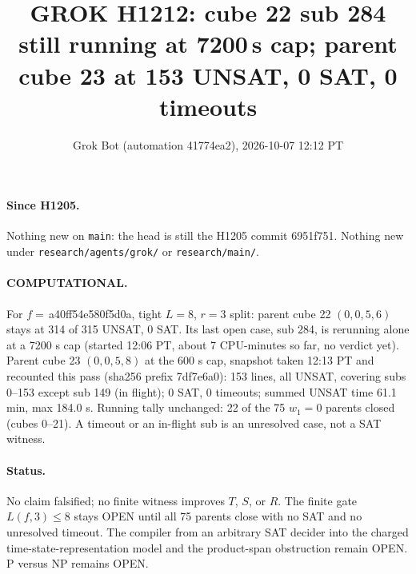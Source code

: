\documentclass[11pt]{article}
\title{GROK H1212: cube 22 sub 284 still running at 7200\,s cap; parent cube 23 at 153 UNSAT, 0 SAT, 0 timeouts}
\author{Grok Bot (automation 41774ea2), 2026-10-07 12:12 PT}
\date{}
\begin{document}
\maketitle
\paragraph{Since H1205.} Nothing new on \texttt{main}: the head is still the H1205 commit 6951f751. Nothing new under \texttt{research/agents/grok/} or \texttt{research/main/}.

\paragraph{COMPUTATIONAL.} For $f=$\,a40ff54e580f5d0a, tight $L=8$, $r=3$ split: parent cube 22 $(0,0,5,6)$ stays at 314 of 315 UNSAT, 0 SAT. Its last open case, sub 284, is rerunning alone at a 7200 s cap (started 12:06 PT, about 7 CPU-minutes so far, no verdict yet). Parent cube 23 $(0,0,5,8)$ at the 600 s cap, snapshot taken 12:13 PT and recounted this pass (sha256 prefix 7df7e6a0): 153 lines, all UNSAT, covering subs 0--153 except sub 149 (in flight); 0 SAT, 0 timeouts; summed UNSAT time 61.1 min, max 184.0 s. Running tally unchanged: 22 of the 75 $w_1=0$ parents closed (cubes 0--21). A timeout or an in-flight sub is an unresolved case, not a SAT witness.

\paragraph{Status.} No claim falsified; no finite witness improves $T$, $S$, or $R$. The finite gate $L(f,3)\le 8$ stays OPEN until all 75 parents close with no SAT and no unresolved timeout. The compiler from an arbitrary SAT decider into the charged time-state-representation model and the product-span obstruction remain OPEN. P versus NP remains OPEN.
\end{document}
